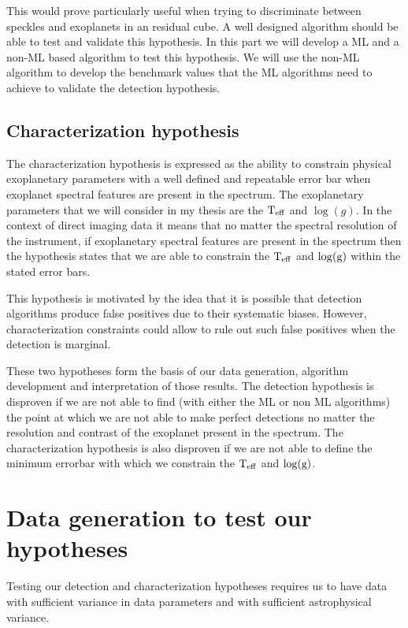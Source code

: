 This would prove particularly useful when trying to discriminate between speckles and exoplanets in an residual cube.
A well designed algorithm should be able to test and validate this hypothesis.
In this part we will develop a ML and a non-ML based algorithm to test this hypothesis.
We will use the non-ML algorithm to develop the benchmark values that the ML algorithms need to achieve to validate the detection hypothesis.

\subsection{Characterization hypothesis}
The characterization hypothesis is expressed as the ability to constrain physical exoplanetary parameters with a well defined and repeatable error bar when exoplanet spectral features are present in the spectrum.
The exoplanetary parameters that we will consider in my thesis are the $\rm{T_{eff}}$ and $\log(g)$.
In the context of direct imaging data it means that no matter the spectral resolution of the instrument, if exoplanetary spectral features are present in the spectrum then the hypothesis states that we are able to constrain the $\rm{T_{eff}}$ and $\log(\rm{g})$ within the stated error bars. 

This hypothesis is motivated by the idea that it is possible that detection algorithms produce false positives due to their systematic biases. 
However, characterization constraints could allow to rule out such false positives when the detection is marginal.

These two hypotheses form the basis of our data generation, algorithm development and interpretation of those results. 
The detection hypothesis is disproven if we are not able to find (with either the ML or non ML algorithms) the point at which we are not able to make perfect detections no matter the resolution and contrast of the exoplanet present in the spectrum.
The characterization hypothesis is also disproven if we are not able to define the minimum errorbar with which we constrain the $\rm{T_{eff}}$ and $\rm{\log(g)}$.

\section{Data generation to test our hypotheses}
Testing our detection and characterization hypotheses requires us to have data with sufficient variance in data parameters and with sufficient astrophysical variance.
